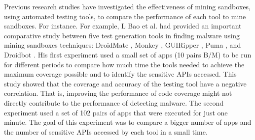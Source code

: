 Previous research studies have investigated the effectiveness of mining sandboxes, using automated testing tools, to compare the performance of each tool to mine sandboxes. For instance. For example, L Bao et al. \cite{bao2018mining} had provided an important comparative study between five test generation tools in finding malware using mining sandboxes techniques: DroidMate \cite{jamrozik2016droidmate}, Monkey \cite{Monkey}, GUIRipper \cite{amalfitano2012using}, Puma \cite{hao2014puma}, and Droidbot \cite{li2017droidbot}. His first experiment used a small set of apps (10 pairs B/M) to be run for different periods to compare how much time the tools needed to achieve the maximum coverage possible and to identify the sensitive APIs accessed. This study showed that the coverage and accuracy of the testing tool have a negative correlation. That is, improving the performance of code coverage might not directly contribute to the performance of detecting malware. The second experiment used a set of 102 pairs of apps that were executed for just one minute. The goal of this experiment was to compare a bigger number of apps and the number of sensitive APIs accessed by each tool in a small time.